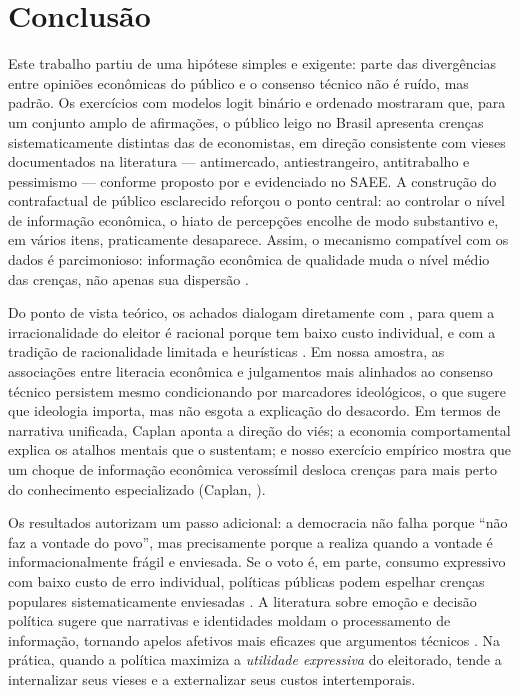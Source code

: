 \chapter{Conclusão}

Este trabalho partiu de uma hipótese simples e exigente: parte das divergências entre opiniões econômicas do público e o consenso técnico não é ruído, mas padrão. Os exercícios com modelos logit binário e ordenado mostraram que, para um conjunto amplo de afirmações, o público leigo no Brasil apresenta crenças sistematicamente distintas das de economistas, em direção consistente com vieses documentados na literatura — antimercado, antiestrangeiro, antitrabalho e pessimismo — conforme proposto por  e evidenciado no SAEE. A construção do contrafactual de público esclarecido reforçou o ponto central: ao controlar o nível de informação econômica, o hiato de percepções encolhe de modo substantivo e, em vários itens, praticamente desaparece. Assim, o mecanismo compatível com os dados é parcimonioso: informação econômica de qualidade muda o nível médio das crenças, não apenas sua dispersão \cite{downs1957economic,simon1955behavioral,Judgment_under_Uncertainty}.

Do ponto de vista teórico, os achados dialogam diretamente com , para quem a irracionalidade do eleitor é racional porque tem baixo custo individual, e com a tradição de racionalidade limitada e heurísticas \cite{simon1955behavioral,Judgment_under_Uncertainty}. Em nossa amostra, as associações entre literacia econômica e julgamentos mais alinhados ao consenso técnico persistem mesmo condicionando por marcadores ideológicos, o que sugere que ideologia importa, mas não esgota a explicação do desacordo. Em termos de narrativa unificada, Caplan aponta a direção do viés; a economia comportamental explica os atalhos mentais que o sustentam; e nosso exercício empírico mostra que um choque de informação econômica verossímil desloca crenças para mais perto do conhecimento especializado (Caplan, \citeyear{Systematically_Biased_Beliefs_about_Economics,The_Myth_of_the_Rational_Voter}).

Os resultados autorizam um passo adicional: a democracia não falha porque “não faz a vontade do povo”, mas precisamente porque a realiza quando a vontade é informacionalmente frágil e enviesada. Se o voto é, em parte, consumo expressivo com baixo custo de erro individual, políticas públicas podem espelhar crenças populares sistematicamente enviesadas \cite{The_Myth_of_the_Rational_Voter}. A literatura sobre emoção e decisão política sugere que narrativas e identidades moldam o processamento de informação, tornando apelos afetivos mais eficazes que argumentos técnicos \cite{westen2007political}. Na prática, quando a política maximiza a \textit{utilidade expressiva} do eleitorado, tende a internalizar seus vieses e a externalizar seus custos intertemporais.

